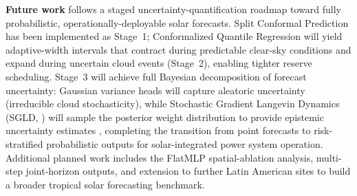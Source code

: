 \textbf{Future work} follows a staged uncertainty-quantification roadmap
toward fully probabilistic, operationally-deployable solar forecasts.
Split Conformal Prediction has been implemented as Stage~1;
Conformalized Quantile Regression \cite{romano2019} will yield adaptive-width
intervals that contract during predictable clear-sky conditions and expand
during uncertain cloud events (Stage~2), enabling tighter reserve scheduling.
Stage~3 will achieve full Bayesian decomposition of forecast uncertainty:
Gaussian variance heads will capture aleatoric uncertainty (irreducible cloud
stochasticity), while Stochastic Gradient Langevin Dynamics (SGLD,
\cite{welling2011}) will sample the posterior weight distribution to provide
epistemic uncertainty estimates \cite{kendall2017}, completing the transition
from point forecasts to risk-stratified probabilistic outputs for
solar-integrated power system operation.
Additional planned work includes the FlatMLP spatial-ablation analysis,
multi-step joint-horizon outputs, and extension to further Latin American sites
to build a broader tropical solar forecasting benchmark.
